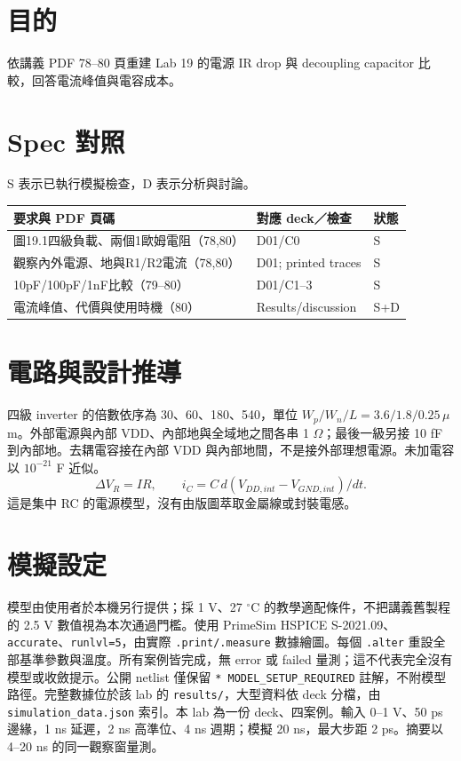 \section{目的}
依講義 PDF 78--80 頁重建 Lab 19 的電源 IR drop 與 decoupling capacitor 比較，回答電流峰值與電容成本。

\section{Spec 對照}
S 表示已執行模擬檢查，D 表示分析與討論。

\small\begin{longtable}{p{.46\linewidth}p{.30\linewidth}p{.15\linewidth}}\toprule
要求與 PDF 頁碼 & 對應 deck／檢查 & 狀態 \\ \midrule\endhead
圖19.1四級負載、兩個1歐姆電阻（78,80） & D01/C0 & S \\
觀察內外電源、地與R1/R2電流（78,80） & D01; printed traces & S \\
10pF/100pF/1nF比較（79--80） & D01/C1--3 & S \\
電流峰值、代價與使用時機（80） & Results/discussion & S+D \\
\bottomrule\end{longtable}\normalsize


\section{電路與設計推導}
四級 inverter 的倍數依序為 30、60、180、540，單位 $W_p/W_n/L=3.6/1.8/0.25\,\mu$m。外部電源與內部 VDD、內部地與全域地之間各串 1 $\Omega$；最後一級另接 10 fF 到內部地。去耦電容接在內部 VDD 與內部地間，不是接外部理想電源。未加電容以 $10^{-21}$ F 近似。
\[\Delta V_R=IR,\qquad i_C=C\,d(V_{DD,int}-V_{GND,int})/dt.\]
這是集中 RC 的電源模型，沒有由版圖萃取金屬線或封裝電感。

\section{模擬設定}
模型由使用者於本機另行提供；採 1 V、27 $^\circ$C 的教學適配條件，不把講義舊製程的 2.5 V 數值視為本次通過門檻。使用 PrimeSim HSPICE S-2021.09、\texttt{accurate}、\texttt{runlvl=5}，由實際 \texttt{.print/.measure} 數據繪圖。每個 \texttt{.alter} 重設全部基準參數與溫度。所有案例皆完成，無 error 或 failed 量測；這不代表完全沒有模型或收斂提示。公開 netlist 僅保留 \texttt{* MODEL\_SETUP\_REQUIRED} 註解，不附模型路徑。完整數據位於該 lab 的 \texttt{results/}，大型資料依 deck 分檔，由 \texttt{simulation\_data.json} 索引。本 lab 為一份 deck、四案例。輸入 0--1 V、50 ps 邊緣，1 ns 延遲，2 ns 高準位、4 ns 週期；模擬 20 ns，最大步距 2 ps。摘要以 4--20 ns 的同一觀察窗量測。

